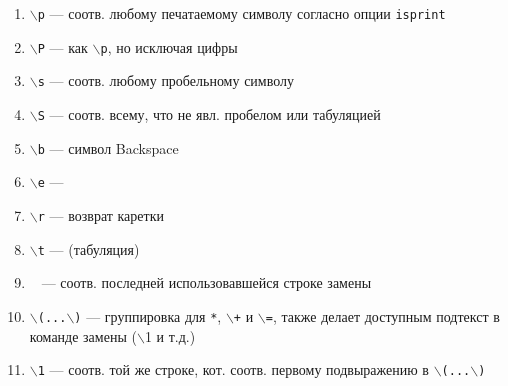 \documentclass[a4paper,10pt, twocolumn]{article}
\newcommand*{\cod}[1]{\texttt{#1}}
\begin{document}
\begin{enumerate}
    \item \cod{$\backslash$p} --- соотв. любому печатаемому символу согласно опции \cod{isprint}
    \item \cod{$\backslash$P} --- как \cod{$\backslash$p}, но исключая цифры
    \item \cod{$\backslash$s} --- соотв. любому пробельному символу
    \item \cod{$\backslash$S} --- соотв. всему, что не явл. пробелом или табуляцией 
    \item \cod{$\backslash$b} --- символ Backspace
    \item \cod{$\backslash$e} --- \Esc
    \item \cod{$\backslash$r} --- возврат каретки
    \item \cod{$\backslash$t} --- \Tab (табуляция)
    \item \cod{~} --- соотв. последней использовавшейся строке замены
    \item \cod{$\backslash$(...$\backslash$)} --- группировка для \cod{*}, \cod{$\backslash$+} и \cod{$\backslash$=}, также делает доступным подтекст в команде замены ($\backslash$1 и т.д.)
    \item \cod{$\backslash$1} --- соотв. той же строке, кот. соотв. первому подвыражению в \cod{$\backslash$(...$\backslash$)}
\end{enumerate}
\end{document}
